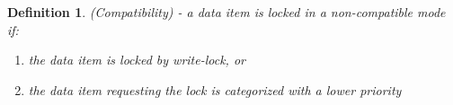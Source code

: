 \documentclass[conference]{IEEEtran}
\newtheorem{definition}{Definition}
\newtheorem{example}{Example}[definition]
\begin{document}



 
 

\begin{definition}
\label{compatibility}
(Compatibility) - a data item is locked in a non-compatible mode if:

\begin{enumerate}
  \item the data item is locked by write-lock, or
  \item the data item requesting the lock is categorized with a lower priority
\end{enumerate}
\end{definition}
\end{document}
